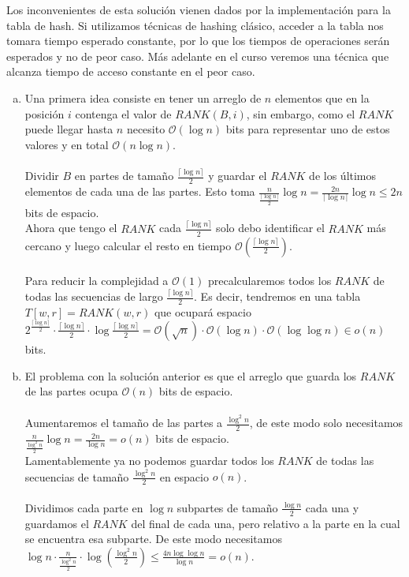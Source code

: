\documentclass[dcc,uchile]{fcfmcourse}
\theoremstyle{plain}
\theoremstyle{definition}
\begin{document}
\begin{problems}
\begin{enumerate}[a)]
    Los inconvenientes de esta solución vienen dados por la implementación para la tabla de hash. Si utilizamos técnicas de hashing clásico, acceder a la tabla nos tomara tiempo esperado constante, por lo que los tiempos de operaciones serán esperados y no de peor caso. Más adelante en el curso veremos una técnica que alcanza tiempo de acceso constante en el peor caso.
    
\end{enumerate}

\begin{enumerate}[a)]
    \item Una primera idea consiste en tener un arreglo de $n$ elementos que en la posición $i$ contenga el valor de $RANK(B,i)$, sin embargo, como el $RANK$ puede llegar hasta $n$ necesito $\mathcal{O}(\log n)$ bits para representar uno de estos valores y en total $\mathcal{O}(n\log n)$. \crying\\

\idea\\
Dividir $B$ en partes de tamaño $\frac{\lceil \log n \rceil}{2}$ y guardar el $RANK$ de los últimos elementos de cada una de las partes. Esto toma $\frac{n}{\frac{\lceil \log n \rceil}{2}}\log n = \frac{2n}{\lceil \log n \rceil}\log n \le 2n$ bits de espacio.\\
Ahora que tengo el $RANK$ cada $\frac{\lceil \log n \rceil}{2}$ solo debo identificar el $RANK$ más cercano y luego calcular el resto en tiempo $\mathcal{O}\left(\frac{\lceil \log n \rceil}{2}\right)$. \\
\idea\\
Para reducir la complejidad a $\mathcal{O}(1)$ precalcularemos todos los $RANK$ de todas las secuencias de largo $\frac{\lceil \log n \rceil}{2}$. Es decir, tendremos en una tabla $T[w,r] = RANK(w,r)$ que ocupará espacio $2^{\frac{\lceil \log n \rceil}{2}} \cdot \frac{\lceil \log n \rceil}{2} \cdot \log{\frac{\lceil \log n \rceil}{2}} = \mathcal{O}(\sqrt{n})\cdot \mathcal{O}(\log n) \cdot \mathcal{O}(\log \log n) \in o(n)$ bits.\wedidit  
\item El problema con la solución anterior es que el arreglo que guarda los $RANK$ de las partes ocupa $\mathcal{O}(n)$ bits de espacio.\\
\idea\\
Aumentaremos el tamaño de las partes a $\frac{\log^2 n}{2}$, de este modo solo necesitamos $\frac{n}{\frac{\log^2 n }{2}}\log n = \frac{2n}{\log n } = o(n)$ bits de espacio.\\
Lamentablemente ya no podemos guardar todos los $RANK$ de todas las secuencias de tamaño $\frac{\log^2 n}{2}$ en espacio $o(n)$. \crying\\
\idea\\
Dividimos cada parte en $\log n$ subpartes de tamaño $\frac{\log n}{2}$ cada una y guardamos el $RANK$ del final de cada una, pero relativo a la parte en la cual se encuentra esa subparte. De este modo necesitamos $\log n \cdot \frac{n}{\frac{\log^2 n}{2}} \cdot \log \left(\frac{\log^2 n}{2}\right) \le \frac{4n\log \log n}{\log n} = o(n)$. \wedidit
\end{enumerate}


\end{problems}
\end{document}
